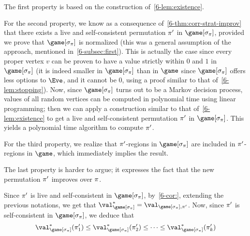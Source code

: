 The first property is based on the construction of~\cref{6-lem:existence}.

For the second property, we know as a consequence of~\cref{6-thm:corr-strat-improv} that there exists a live and
self-consistent permutation $\pi'$ in $\game[\sigma_{\perm}]$,
provided we prove that $\game[\sigma_{\perm}]$ is normalized (this was
a general assumption of the approach, mentioned in~\cref{6-subsec:first}). This is actually the case since
every proper vertex $v$ can be proven to have a value strictly within
$0$ and $1$ in $\game[\sigma_{\perm}]$ (it is indeed smaller in
$\game[\sigma_{\perm}]$ than in $\game$ since $\game[\sigma_{\perm}]$
offers less options to $\Eve$, and it cannot be $0$, using a proof
similar to that of~\cref{6-lem:stopping}).
Now, since $\game[\sigma_\perm]$ turns out to be a Markov decision
process, values of all random vertices can be computed in polynomial
time using linear programming; then we can apply a construction
similar to that of~\cref{6-lem:existence} to get a live and
self-consistent permutation $\pi'$ in $\game[\sigma_\perm]$. This
yields a polynomial time algorithm to compute $\pi'$.

For the third property, we realize that $\pi'$-regions in $\game[\sigma_\perm]$ are included in $\pi'$-regions in $\game$, which immediately implies the result.

The last property is harder to argue; it expresses the fact that the
new permutation $\pi'$ improves over $\pi$.  %

Since $\pi'$ is live and self-consistent in $\game[\sigma_\perm]$,
by~\cref{6-cor:}, extending the previous notations, we
get that
$\val^*_{\game[\sigma_\perm]} =
\val_{\game[\sigma_\perm],\perm'}$. Now, since $\pi'$ is
self-consistent in $\game[\sigma_\perm]$, we deduce that
\[
  \val^*_{\game[\sigma_\perm]}(\perm'_1) \le
  \val^*_{\game[\sigma_\perm]}(\perm'_2) \le \dots \le
  \val^*_{\game[\sigma_\perm]}(\perm'_k)
\]

